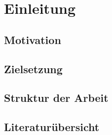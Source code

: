 \chapter{Einleitung}

\section{Motivation}

\section{Zielsetzung}

\section{Struktur der Arbeit}

\section{Literaturübersicht}